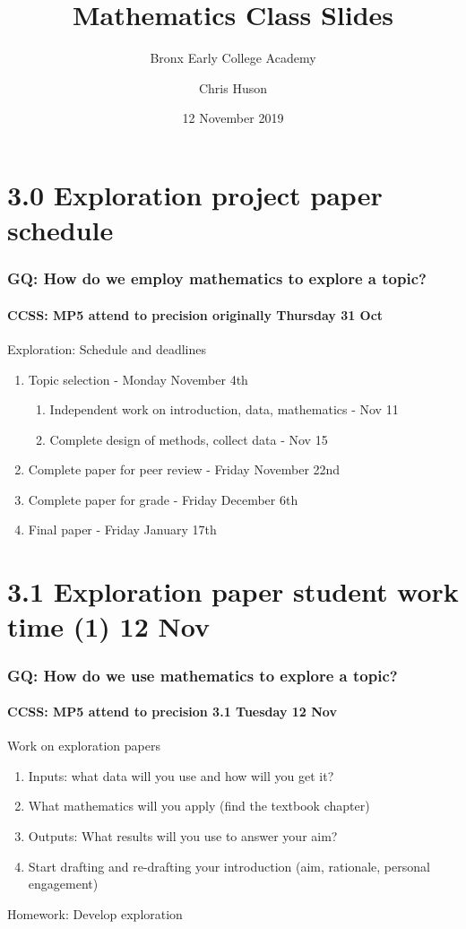 \documentclass{beamer}
\title{Mathematics Class Slides}
\subtitle{Bronx Early College Academy}
\author{Chris Huson}
\date{12 November 2019}
\begin{document}
\frame{\titlepage}
\section[Outline]{}
\frame{\tableofcontents}

\section{3.0 Exploration project paper schedule}
\frame
{
  \frametitle{GQ: How do we employ mathematics to explore a topic?}
  \framesubtitle{CCSS: MP5 attend to precision \hfill \alert{originally Thursday 31 Oct}}
  \begin{block}{Exploration: Schedule and deadlines}
    \begin{enumerate}
      \item Topic selection - Monday November 4th
      \begin{enumerate}
        \item Independent work on introduction, data, mathematics - Nov 11
        \item Complete design of methods, collect data - Nov 15
      \end{enumerate}
      \item Complete paper for peer review - Friday November 22nd
      \item Complete paper for grade - Friday December 6th
      \item Final paper - Friday January 17th
    \end{enumerate}
    \end{block}
}

\section{3.1 Exploration paper student work time (1) 12 Nov}
\frame
{
  \frametitle{GQ: How do we use mathematics to explore a topic?}
  \framesubtitle{CCSS: MP5 attend to precision \hfill \alert{3.1 Tuesday 12 Nov}}

  \begin{block}{Work on exploration papers}
  \begin{enumerate}
      \item Inputs: what data will you use and how will you get it? 
      \item What mathematics will you apply (find the textbook chapter)
      \item Outputs: What results will you use to answer your aim?
      \item Start drafting and re-drafting your introduction (aim, rationale, personal engagement)
  \end{enumerate}
  \end{block}
  Homework: Develop exploration 
}
\end{document}
